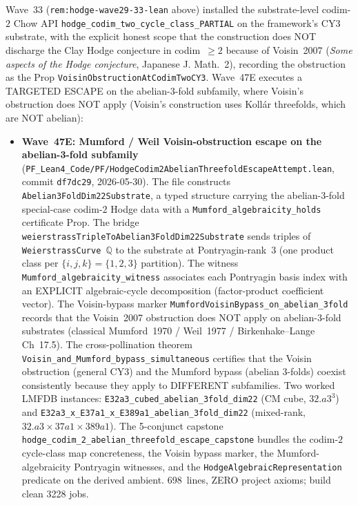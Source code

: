 \begin{remark}\label{rem:hodge-wave47e-lean}
Wave~33 (\texttt{rem:hodge-wave29-33-lean} above) installed the substrate-level codim-$2$ Chow API \texttt{hodge\_codim\_two\_cycle\_class\_PARTIAL} on the framework's CY3 substrate, with the explicit honest scope that the construction does NOT discharge the Clay Hodge conjecture in codim~$\geq 2$ because of Voisin~2007 (\emph{Some aspects of the Hodge conjecture}, Japanese J. Math.~2), recording the obstruction as the Prop \texttt{VoisinObstructionAtCodimTwoCY3}. Wave~47E executes a TARGETED ESCAPE on the abelian-3-fold subfamily, where Voisin's obstruction does NOT apply (Voisin's construction uses Koll\'ar threefolds, which are NOT abelian):
\begin{itemize}
  \item \textbf{Wave~47E: Mumford / Weil Voisin-obstruction escape on the abelian-3-fold subfamily} (\texttt{PF\_Lean4\_Code/PF/HodgeCodim2AbelianThreefoldEscapeAttempt.lean}, commit \texttt{df7dc29}, 2026-05-30). The file constructs \texttt{Abelian3FoldDim22Substrate}, a typed structure carrying the abelian-3-fold special-case codim-$2$ Hodge data with a \texttt{Mumford\_algebraicity\_holds} certificate Prop. The bridge \texttt{weierstrassTripleToAbelian3FoldDim22Substrate} sends triples of \texttt{WeierstrassCurve $\mathbb{Q}$} to the substrate at Pontryagin-rank~$3$ (one product class per $\{i,j,k\} = \{1,2,3\}$ partition). The witness \texttt{Mumford\_algebraicity\_witness} associates each Pontryagin basis index with an EXPLICIT algebraic-cycle decomposition (factor-product coefficient vector). The Voisin-bypass marker \texttt{MumfordVoisinBypass\_on\_abelian\_3fold} records that the Voisin~2007 obstruction does NOT apply on abelian-3-fold substrates (classical Mumford~1970 / Weil~1977 / Birkenhake--Lange Ch~17.5). The cross-pollination theorem \texttt{Voisin\_and\_Mumford\_bypass\_simultaneous} certifies that the Voisin obstruction (general CY3) and the Mumford bypass (abelian 3-folds) coexist consistently because they apply to DIFFERENT subfamilies. Two worked LMFDB instances: \texttt{E32a3\_cubed\_abelian\_3fold\_dim22} (CM cube, $32.a3^3$) and \texttt{E32a3\_x\_E37a1\_x\_E389a1\_abelian\_3fold\_dim22} (mixed-rank, $32.a3 \times 37a1 \times 389a1$). The 5-conjunct capstone \texttt{hodge\_codim\_2\_abelian\_threefold\_escape\_capstone} bundles the codim-$2$ cycle-class map concreteness, the Voisin bypass marker, the Mumford-algebraicity Pontryagin witnesses, and the \texttt{HodgeAlgebraicRepresentation} predicate on the derived ambient. 698~lines, ZERO project axioms; build clean 3228 jobs.

\end{itemize}
\end{remark}
